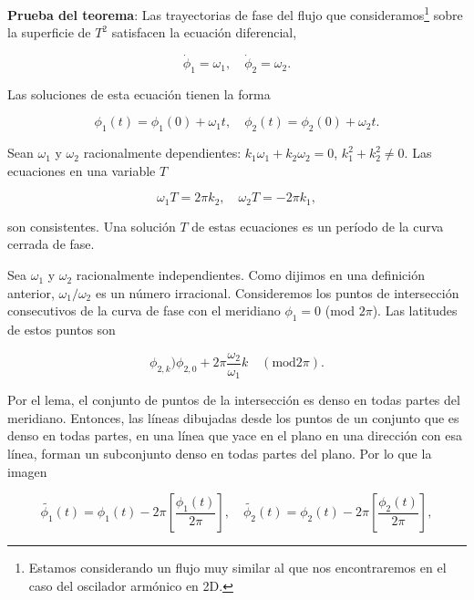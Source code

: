 \documentclass[a4paper,10pt]{article}
\numberwithin{equation}{section}
\begin{document}
\vspace{.3cm}

\textbf{Prueba del teorema}: Las trayectorias de fase del flujo que consideramos\footnote{Estamos considerando
un flujo muy similar al que nos encontraremos en el caso del oscilador armónico en 2D.}
sobre la superficie de $T^2$ satisfacen la ecuación diferencial,

\begin{equation}
 \dot{\phi}_1 = \omega_1, \quad \dot{\phi}_2 = \omega_2.
\end{equation}

Las soluciones de esta ecuación tienen la forma

\begin{equation}
 \phi_1 (t) = \phi_1 (0) + \omega_1 t, \quad \phi_2 (t) = \phi_2 (0) + \omega_2 t.
\end{equation}

Sean $\omega_1$ y $\omega_2$ racionalmente dependientes: $k_1\omega_1 + k_2 \omega_2 = 0$,
$k_1^2+k_2^2 \ne 0$. Las ecuaciones en una variable $T$ 

\begin{equation}
 \omega_1 T = 2 \pi k_2, \quad \omega_2 T = - 2 \pi k_1,
\end{equation}

son consistentes. Una solución $T$ de estas ecuaciones es un período de la curva 
cerrada de fase.

\vspace{.3cm}

Sea $\omega_1$ y $\omega_2$ racionalmente independientes. Como dijimos en una definición 
anterior, $\omega_1/\omega_2$ es un número irracional. Consideremos los puntos de 
intersección consecutivos de la curva de fase con el meridiano $\phi_1=0$ (mod $2\pi$). 
Las latitudes de estos puntos son

\begin{equation}
 \phi_{2,k} ) \phi_{2,0} + 2\pi \frac{\omega_2}{\omega_1}k \quad (\text{mod} 2\pi).
\end{equation}

Por el lema, el conjunto de puntos de la intersección es denso en todas partes del 
meridiano. Entonces, las líneas dibujadas desde los puntos de un conjunto que es 
denso en todas partes, en una línea que yace en el plano en una dirección con 
esa línea, forman un subconjunto denso en todas partes del plano. Por lo que la imagen

\begin{equation}
 \tilde{\phi_1}(t) = \phi_1 (t) - 2\pi \left[\frac{\phi_1(t)}{2\pi} \right], \quad
  \tilde{\phi_2}(t) = \phi_2 (t) - 2\pi \left[\frac{\phi_2(t)}{2\pi} \right],
\end{equation}
\end{document}
